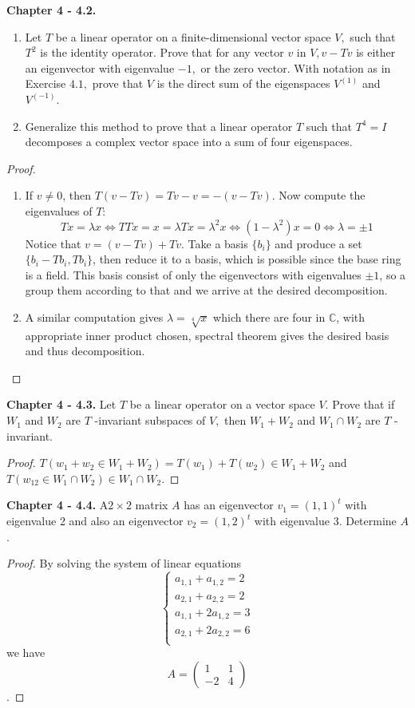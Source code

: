 \documentclass[10pt]{report}
\theoremstyle{definition}
\begin{document}
\textbf{Chapter 4 - 4.2.}
\begin{enumerate}[label=(\alph*)]
\item Let $T$ be a linear operator on a finite-dimensional vector space $V,$ such that $T^{2}$ is the identity operator. Prove that for any vector $v$ in $V, v-T v$ is either an eigenvector with eigenvalue $-1,$ or the zero vector. With notation as in Exercise $4.1,$ prove that $V$ is the direct sum of the eigenspaces $V^{(1)}$ and $V^{(-1)}$.
\item Generalize this method to prove that a linear operator $T$ such that $T^{4}=I$ decomposes a complex vector space into a sum of four eigenspaces.
\end{enumerate}
\begin{proof}\leavevmode
\begin{enumerate}[label=(\alph*)]
\item If $v\neq0$, then $T(v-Tv)=Tv-v=-(v-Tv)$. Now compute the eigenvalues of $T$:
$$Tx=\lambda x\Leftrightarrow TTx=x=\lambda Tx=\lambda^2x\Leftrightarrow(1-\lambda^2)x=0\Leftrightarrow\lambda=\pm1$$
Notice that $v=(v-Tv)+Tv$. Take a basis $\{b_i\}$ and produce a set $\{b_i-Tb_i,Tb_i\}$, then reduce it to a basis, which is possible since the base ring is a field. This basis consist of only the eigenvectors with eigenvalues $\pm1$, so a group them according to that and we arrive at the desired decomposition.
\item A similar computation gives $\lambda=\sqrt[4]{x}$ which there are four in $\mathbb{C}$, with appropriate inner product chosen, spectral theorem gives the desired basis and thus decomposition.
\end{enumerate}
\end{proof}

\textbf{Chapter 4 - 4.3.} Let $T$ be a linear operator on a vector space $V .$ Prove that if $W_{1}$ and $W_{2}$ are $T$ -invariant subspaces of $V,$ then $W_{1}+W_{2}$ and $W_{1} \cap W_{2}$ are $T$ -invariant.
\begin{proof}
$T(w_1+w_2\in W_1+W_2)=T(w_1)+T(w_2)\in W_1+W_2$ and $T(w_12\in W_1\cap W_2)\in W_1\cap W_2$.
\end{proof}

\textbf{Chapter 4 - 4.4.} $\mathrm{A} 2 \times 2$ matrix $A$ has an eigenvector $v_{1}=(1,1)^{t}$ with eigenvalue 2 and also an eigenvector $v_{2}=(1,2)^{t}$ with eigenvalue $3 .$ Determine $A$.
\begin{proof}
By solving the system of linear equations
$$\begin{cases}
a_{1,1}+a_{1,2}=2\\
a_{2,1}+a_{2,2}=2\\
a_{1,1}+2a_{1,2}=3\\
a_{2,1}+2a_{2,2}=6\\
\end{cases}$$
we have
$$
A=\begin{pmatrix}
1&1\\-2&4
\end{pmatrix}
$$.
\end{proof}
\end{document}
